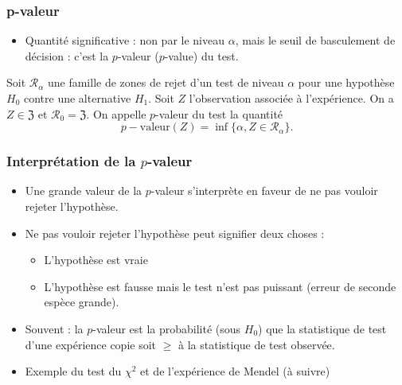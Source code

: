 \begin{frame}
\frametitle{p-valeur}
\begin{itemize}
\item Quantité \alert{significative} : non par le niveau $\alpha$, mais le \alert{seuil de basculement de décision} : c'est la $p$-valeur ($p$-value) du test.
\end{itemize}
\begin{df}
Soit ${\mathcal R}_\alpha$ une famille de zones de rejet d'un test de niveau $\alpha$ pour une hypothèse $H_0$ contre une alternative $H_1$. Soit $Z$ l'observation associée à l'expérience. On a $Z \in \mathfrak{Z}$ et ${\mathcal R}_0 = \mathfrak{Z}$.
On appelle \alert{$p$-valeur du test} la quantité
$$p-\text{valeur}(Z) = \inf\{\alpha, Z \in {\mathcal R}_\alpha\}.$$
\end{df}
\end{frame}

\begin{frame}
\frametitle{Interprétation de la $p$-valeur}
\begin{itemize}
\item Une grande valeur de la $p$-valeur s'interprète en faveur de \alert{ne pas vouloir rejeter l'hypothèse}.
\item  Ne pas vouloir rejeter l'hypothèse  peut signifier deux choses :
\begin{itemize}
\item L'hypothèse est vraie
\item L'hypothèse est fausse \alert{ mais} le test n'est pas \alert{puissant} (erreur de seconde espèce \alert{grande}).
\end{itemize}
\item \alert{Souvent :} la $p$-valeur est la probabilité (sous $H_0$) que la statistique de test d'une expérience  copie  soit $\geq$ à la statistique de test observée.
\item \alert{Exemple du test du $\chi^2$ et de l'expérience de Mendel} (à suivre) %
\end{itemize}
\end{frame}





